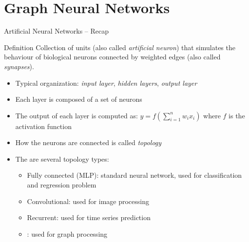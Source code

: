 \documentclass[presentation, 9pt]{beamer}\mode<presentation>{\usetheme{AMSBolognaFC}}
\begin{document}
\section{Graph Neural Networks}
\begin{frame}{Artificial Neural Networks -- Recap}
\begin{alertblock}{Definition}
	Collection of units (also called \emph{artificial neuron}) that simulates the behaviour of biological neurons
	connected by weighted edges (also called \emph{synapses}).
\end{alertblock}
\begin{itemize}
	\item Typical organization: \emph{input layer}, \emph{hidden layers}, \emph{output layer}
	\item Each layer is composed of a set of neurons
	\item The output of each layer is computed as: $y = f(\sum_{i=1}^n w_i x_i)$ where $f$ is the activation function
	\item How the neurons are connected is called \emph{topology}
	\item The are several topology types:
	\begin{itemize}
		\item Fully connected (MLP): standard neural network, used for classification and regression problem 
		\item Convolutional: used for image processing
		\item Recurrent: used for time series prediction
		\item {}: used for graph processing
	\end{itemize}
\end{itemize}
\end{frame}
\end{document}
